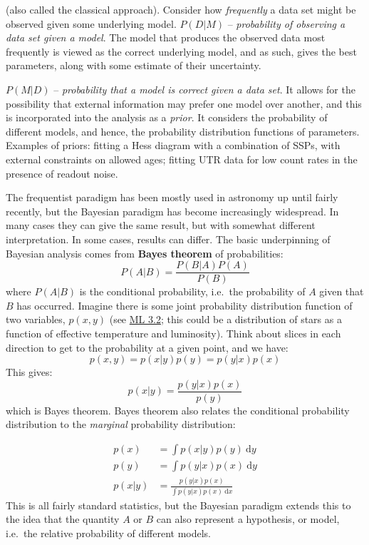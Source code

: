 \documentclass{article}
\begin{document}
\begin{description}[itemsep=0ex]
    \item [Frequentism] (also called the classical approach).
        Consider how \emph{frequently} a data set might be observed given
        some underlying model. {\bf $P(D|M)$} -- \emph{probability of
        observing a data set given a model}. The model that
        produces the observed data most frequently is viewed as the correct
        underlying model, and as such, gives the best parameters, along
        with some estimate of their uncertainty.
    \item [Bayesian]
        {\bf $P(M|D)$} -- \emph{probability that a model is correct
        given a data set}.
        It allows for the possibility that external information may prefer
        one model over another, and this is incorporated into the analysis
        as a \emph{prior}. It considers the probability of different models,
        and hence, the probability distribution functions of parameters.
        Examples of priors: fitting a Hess diagram with a combination of
        SSPs, with external constraints on allowed ages; fitting UTR data
        for low count rates in the presence of readout noise.
\end{description}
The frequentist paradigm has been mostly used in astronomy up until fairly
recently, but the Bayesian paradigm has become increasingly widespread. In
many cases they can give the same result, but with somewhat different
interpretation. In some cases, results can differ. The basic underpinning of
Bayesian analysis comes from {\bf Bayes theorem} of probabilities:
    $$ P(A|B) = \frac{P(B|A)P(A)}{P(B)} $$
where $P(A|B)$ is the conditional probability, i.e.\ the probability of $A$ given
that $B$ has occurred. Imagine there is some joint probability distribution
function of two variables, $p(x,y)$
(see \href{http://astronomy.nmsu.edu/holtz/a575/images/ML3.2.png}
{ML 3.2}; this could be a distribution
of stars as a function of effective temperature and luminosity). Think about
slices in each direction to get to the probability at a given point, and we
have:
    $$ p(x,y) = p(x|y)p(y) = p(y|x)p(x) $$
This gives:
    $$ p(x|y) = \frac{p(y|x)p(x)}{p(y)} $$
which is Bayes theorem. Bayes theorem also relates the conditional probability
distribution to the \emph{marginal} probability distribution:

\begin{align*}
    p(x) &= \int \! p(x|y)p(y) \ \mathrm{d}y \\
    p(y) &= \int \! p(y|x)p(x) \ \mathrm{d}y \\
    p(x|y) &= \frac{p(y|x)p(x)}{\int \! p(y|x)p(x) \ \mathrm{d}x}
\end{align*}
This is all fairly standard statistics, but the Bayesian paradigm extends
this to the idea that the quantity $A$ or $B$ can also represent a hypothesis,
or model, i.e.\ the relative probability of different models.
\end{document}
